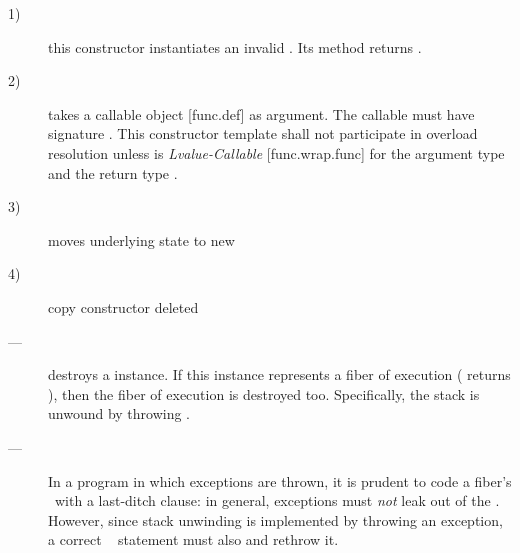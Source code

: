 \begin{description}
    \item[1)] this constructor instantiates an invalid \fiber. Its  method
              returns .
    \item[2)] takes a callable object [func.def] as
              argument. The callable must have signature . This constructor template shall not
              participate in overload resolution unless 
              is \emph{Lvalue-Callable} [func.wrap.func] for the argument
              type  and the return type \fiber.
               
    \item[3)] moves underlying state to new \fiber
    \item[4)] copy constructor deleted
\end{description}


\effects
\begin{description}
    \item[---] destroys a \fiber instance. If this instance represents a fiber
              of execution ( returns ), then the fiber of
              execution is destroyed too. Specifically, the stack is unwound
              by throwing \unwindex.
\end{description}

\remarks
\begin{description}
    \item[---] In a program in which exceptions
              are thrown, it is prudent to code a fiber's \entryfn\ with a
              last-ditch  clause: in general, exceptions must
              \emph{not} leak out of the \entryfn. However, since stack
              unwinding is implemented by throwing an exception, a correct
              \entryfn\  statement must also
               and rethrow it.
\end{description}

